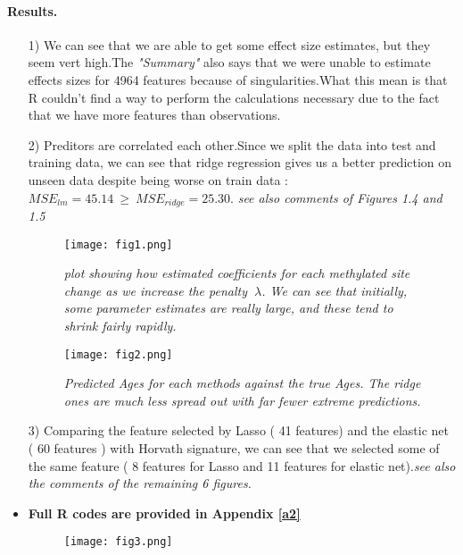 \documentclass[12pt]{report}
\begin{document}
\paragraph{Results.}
\begin{itemize}
	\item[1)] We can see  that we are able to get some effect size estimates, but they seem vert high.The \textit{"Summary"} also says that we were unable to estimate effects sizes for 4964 features because of  singularities.What this mean is that R couldn't find a way to perform the calculations necessary due to the fact that we have more features than observations.
	\item[2)] Preditors are correlated each other.Since we split the data into test and training data, we can see that ridge regression gives us a better prediction on unseen data despite being worse on train data : $MSE_{lm}=45.14 \ \geq\ MSE_{ridge}=25.30 $. \textit{see also comments of Figures 1.4 and 1.5}
	
			\begin{figure}[b]
				\begin{minipage}[c]{0.49\textwidth}
			\centering
				\texttt{[image: fig1.png]}
			
			\caption[plot showing how estimated coefficients for each methylated site change]{\textit{plot showing how estimated coefficients for each methylated site change as we increase the penalty $\ \lambda$. We can see that initially, some parameter estimates are really large, and these tend to shrink fairly rapidly.} }
		\end{minipage}
	\hfill
	\begin{minipage}[c]{0.49\textwidth}
		\centering
		\texttt{[image: fig2.png]}
			\caption[Predicted Ages for each methods against the true Ages]{\textit{Predicted Ages for each methods against the true Ages. The ridge ones are much less spread out with far fewer extreme predictions.}}
	\end{minipage}
		\end{figure}
	\item[3)] Comparing the feature selected by Lasso ( 41 features) and the elastic net ( 60 features ) with Horvath signature, we can see that we selected some of the same feature ( 8 features for Lasso and 11 features for elastic net).\textit{see also the comments of the remaining 6 figures.}
	\item \textbf{Full R codes are provided in Appendix \ref{a2}}
	
	\begin{figure}
		\begin{minipage}[c]{0.49\textwidth}
			\centering
			\texttt{[image: fig3.png]}
			

\end{minipage}
\end{figure}
\end{itemize}
\end{document}
